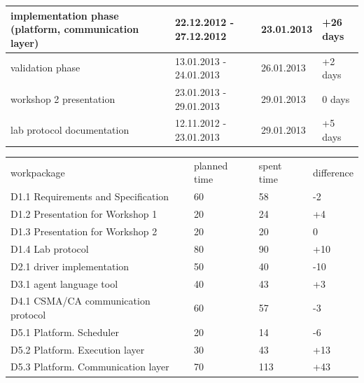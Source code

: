 \documentclass{scrreprt}
\begin{document}
\begin{tabular}{|>{\raggedright}m{5cm}|l|l|l|}
implementation phase (platform, communication layer)
&  22.12.2012 - 27.12.2012			& 23.01.2013	 	& +26 days	\\\hline

validation phase
&  13.01.2013 - 24.01.2013			& 26.01.2013	 	& +2 days	\\\hline

workshop 2 presentation
&  23.01.2013 - 29.01.2013			& 29.01.2013	 	& 0 days	\\\hline

lab protocol documentation
&  12.11.2012 - 23.01.2013			& 29.01.2013	 	& +5 days	\\\hline

\hline
\end{tabular}



\vspace{0.2in}
\begin{tabular}{|>{\raggedright}m{5cm}|l|l|l|}
\hline \multicolumn{4}{|c|}{\textbf{Spent time per workpackage}}\\
\hline
workpackage		&  planned time			& spent time		&  difference		\\\hline


D1.1 Requirements and Specification
& 60 		& 58	 		& -2	\\\hline

D1.2 Presentation for Workshop 1
& 20 		& 24 	 		& +4	\\\hline

D1.3 Presentation for Workshop 2
& 20 		& 20 	 		& 0	\\\hline

D1.4 Lab protocol
& 80 		& 90	 		& +10	\\\hline

D2.1 driver implementation
& 50 		& 40      	 	& -10	\\\hline

D3.1 agent language tool
& 40 		& 43 	 		& +3	\\\hline

D4.1 CSMA/CA communication protocol
& 60 		& 57 	 		& -3	\\\hline

D5.1 Platform. Scheduler
& 20		& 14 	 		& -6	\\\hline

D5.2 Platform. Execution layer
& 30 		& 43	 		& +13	\\\hline

D5.3 Platform. Communication layer
& 70 		& 113 	 		& +43 	\\\hline
\hline
\end{tabular}
\end{document}
